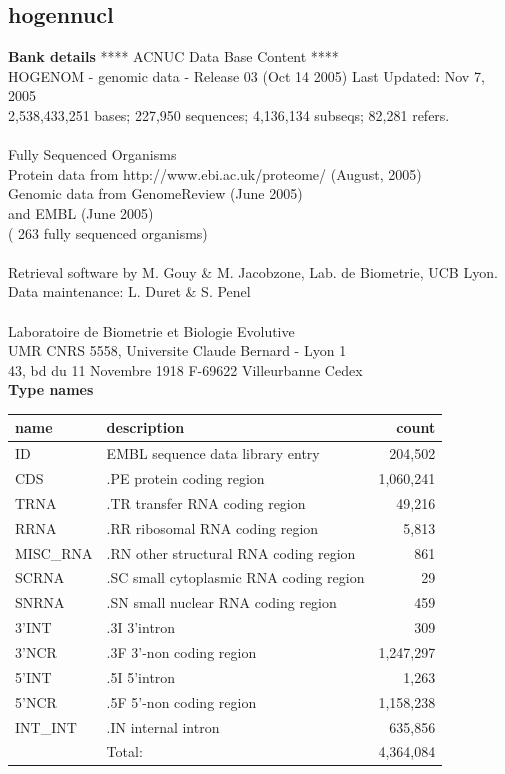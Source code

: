 \documentclass{article}
\begin{document}
\begin{Schunk}
\section{ hogennucl }
\textbf{Bank details}
               ****     ACNUC Data Base Content      ****                      \\
  HOGENOM - genomic data - Release 03 (Oct 14 2005) Last Updated: Nov  7, 2005\\
2,538,433,251 bases; 227,950 sequences; 4,136,134 subseqs; 82,281 refers.\\
                                                                               \\
                        Fully Sequenced Organisms\\
   Protein data from http://www.ebi.ac.uk/proteome/ (August, 2005)\\
          Genomic data from GenomeReview  (June 2005) \\
                  and  EMBL (June 2005)\\
	   ( 263 fully sequenced organisms)\\
\\
Retrieval software by M. Gouy \& M. Jacobzone, Lab. de Biometrie, UCB Lyon.\\
Data maintenance: L. Duret \& S. Penel\\
\\
Laboratoire de Biometrie et Biologie Evolutive\\
UMR CNRS 5558, Universite Claude Bernard - Lyon 1 \\
43, bd du 11 Novembre 1918 F-69622 Villeurbanne Cedex\\


\textbf{Type names}
\noindent\begin{tabular}{llr}
\hline \hline
name & description & count \\
\hline
ID  &  EMBL sequence data library entry  &  204,502 \\
CDS  &  .PE protein coding region  &  1,060,241 \\
TRNA  &  .TR transfer RNA coding region  &  49,216 \\
RRNA  &  .RR ribosomal RNA coding region  &  5,813 \\
MISC\_RNA  &  .RN other structural RNA coding region  &  861 \\
SCRNA  &  .SC small cytoplasmic RNA coding region  &  29 \\
SNRNA  &  .SN small nuclear RNA coding region  &  459 \\
3'INT  &  .3I 3'intron  &  309 \\
3'NCR  &  .3F  3'-non coding region  &  1,247,297 \\
5'INT  &  .5I 5'intron  &  1,263 \\
5'NCR  &  .5F  5'-non coding region  &  1,158,238 \\
INT\_INT  &  .IN  internal intron  &  635,856 \\
\hline
 & Total: & 4,364,084 \\
\hline \hline
\end{tabular}


\end{Schunk}
\end{document}

